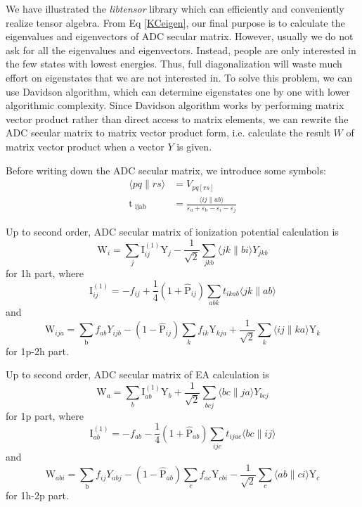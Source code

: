 We have illustrated the \emph{libtensor} library which can efficiently and conveniently realize tensor algebra.
From Eq \ref{KCeigen}, our final purpose is to calculate the eigenvalues and eigenvectors of ADC secular matrix.
However, usually we do not ask for all the eigenvalues and eigenvectors.
Instead, people are only interested in the few states with lowest energies.
Thus, full diagonalization will waste much effort on eigenstates that we are not interested in.
To solve this problem, we can use Davidson algorithm, which can determine eigenstates one by one with lower algorithmic complexity.
Since Davidson algorithm works by performing matrix vector product rather than direct access to matrix elements, we can rewrite the ADC secular matrix to matrix vector product form, i.e. calculate the result $W$ of matrix vector product when a vector $Y$ is given.

Before writing down the ADC secular matrix, we introduce some symbols:
\begin{equation}
	\begin{aligned}
		\langle pq \| rs \rangle&=V_{pq[rs]}
		\\
		\mathrm{t}_{\text { ijab }}&=\frac{\langle i j\| a b\rangle}{\varepsilon_{a}+\varepsilon_{\mathrm{b}}-\varepsilon_{i}-\varepsilon_{j}}
	\end{aligned}
\end{equation}

Up to second order, ADC secular matrix of ionization potential calculation is
\begin{equation}
	\mathrm{W}_{i}=\sum_{j} \mathrm{I}_{i j}^{(1)} \mathrm{Y}_{j}-\frac{1}{\sqrt{2}} \sum_{j k b}\langle j k\| b i\rangle Y_{j k b}
\end{equation}
for 1h part, where
\begin{equation}
\mathrm{I}_{i j}^{(1)}=-f_{i j}+\frac{1}{4}\left(1+\hat{\mathrm{P}}_{i j}\right) \sum_{a b k} t_{i k a b}\langle j k \| a b\rangle
\end{equation}
and
\begin{equation}
	\mathrm{W}_{i j a}=\sum_{\mathrm{b}} f_{a b} Y_{i j b}-\left(1-\hat{\mathrm{P}}_{i j}\right) \sum_{k} f_{i k} \mathrm{Y}_{k j a}+\frac{1}{\sqrt{2}} \sum_{k}\langle i j\| k a\rangle \mathrm{Y}_{k}
\end{equation}
for 1p-2h part.

Up to second order, ADC secular matrix of EA calculation is
\begin{equation}
	\mathrm{W}_{a}=\sum_{b} \mathrm{I}_{a b}^{(1)} \mathrm{Y}_{b}+\frac{1}{\sqrt{2}} \sum_{b c j}\langle b c\| j a\rangle Y_{b c j}
\end{equation}
for 1p part, where
\begin{equation}
\mathrm{I}_{a b}^{(1)}=-f_{a b}-\frac{1}{4}\left(1+\hat{\mathrm{P}}_{a b}\right) \sum_{i j c} t_{i j a c}\langle b c \| i j\rangle
\end{equation}
and
\begin{equation}
	\mathrm{W}_{a b i}=\sum_{\mathrm{b}} f_{i j} Y_{a b j}-\left(1-\hat{\mathrm{P}}_{a b}\right) \sum_{c} f_{a c} \mathrm{Y}_{c b i}-\frac{1}{\sqrt{2}} \sum_{c}\langle a b\| c i\rangle \mathrm{Y}_{c}
\end{equation}
for 1h-2p part.

